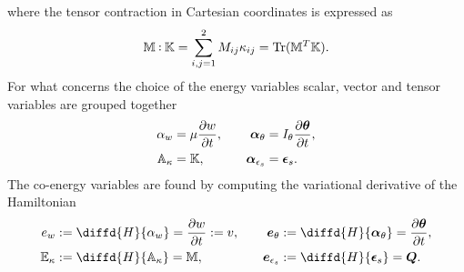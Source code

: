 \documentclass[preprint,12pt]{elsarticle}
\DeclareMathOperator{\Tr}{Tr}
\def\onedot{$\mathsurround0pt\ldotp$}
\def\cddot{%
	\mathbin{\vcenter{\baselineskip.67ex
			\hbox{\onedot}\hbox{\onedot}}%
}}
\begin{document}
where the tensor contraction in Cartesian coordinates is expressed as
\[\mathbb{M} \cddot \mathbb{K} = \sum_{i,j = 1}^{2} M_{ij} \kappa_{ij} = \Tr(\mathbb{M}^T \mathbb{K}).  \]
For what concerns the choice of the energy variables scalar, vector and tensor variables are grouped together
\begin{equation}
\begin{aligned}
\alpha_w &= \mu \diffp{w}{t}, \\
\mathbb{A}_{\kappa} &= \mathbb{K}, \\
\end{aligned} \qquad
\begin{aligned}
\bm\alpha_{\theta} &= I_{\theta}  \diffp{\bm{\theta}}{t}, \\
\bm\alpha_{\epsilon_s} &= \bm{\epsilon}_s. \\
\end{aligned}
\end{equation}
The co-energy variables are found by computing the variational derivative of the Hamiltonian
\begin{equation}
\begin{aligned}
e_w &:= \diffd{H}{\alpha_w} = \diffp{w}{t} := v,  \\
\mathbb{E}_{\kappa} &:= \diffd{H}{\mathbb{A}_{\kappa}} = \mathbb{M}, \\
\end{aligned} \qquad
\begin{aligned}
\bm{e}_{\theta} &:= \diffd{H}{\bm\alpha_{\theta}} = \diffp{\bm{\theta}}{t}, \\
\bm{e}_{\epsilon_s} &:= \diffd{H}{\bm{\epsilon}_s} = \bm{Q}. \\
\end{aligned}
\end{equation}
\end{document}
